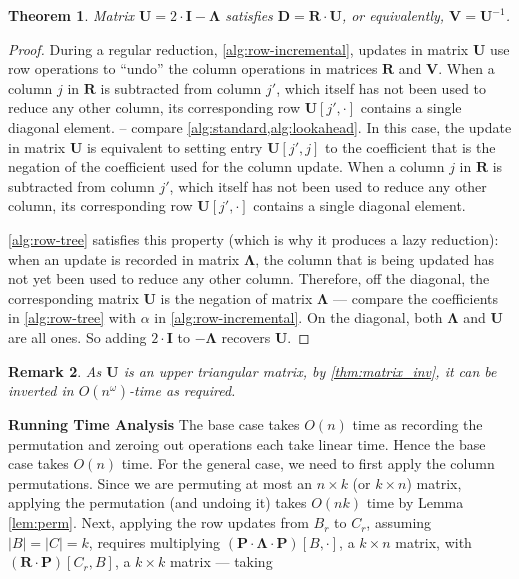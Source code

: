 \documentclass[10pt,a4paper]{article}
\newtheorem{theorem}{Theorem}[section]
\newtheorem{remark}[theorem]{Remark}
\newcommand{\matsize}[2]{#1\times #2}
\newcommand{\matexp}{\omega}
\newcommand{\mat}[1]{\mathbf{#1}}
\begin{document}
\begin{theorem}
    Matrix $\mat{U} = 2\cdot \mat{I} - \mat{\Lambda}$ satisfies $\mat{D} = \mat{R} \cdot \mat{U}$, or equivalently, $\mat{V} = \mat{U}^{-1}$.
\end{theorem}
\begin{proof}
    During a regular reduction, \cref{alg:row-incremental}, updates in matrix $\mat{U}$ use row operations to ``undo'' the column operations in matrices $\mat{R}$ and $\mat{V}$. When a column $j$ in $\mat{R}$ is subtracted from column $j'$, which itself has not been used to reduce any other column, its corresponding row $\mat{U}[j',\cdot]$ contains a single diagonal element.
     -- compare \cref{alg:standard,alg:lookahead}.
    In this case, the update in matrix $\mat{U}$ is equivalent to setting entry $\mat{U}[j',j]$ to the coefficient that is the negation of the coefficient used for the column update.
%
%
 When a column $j$ in $\mat{R}$ is subtracted from column $j'$, which itself has not been used to reduce any other column, its corresponding row $\mat{U}[j',\cdot]$ contains a single diagonal element.

    \cref{alg:row-tree} satisfies this property (which is why it produces a lazy reduction): when an update is recorded in matrix $\mat{\Lambda}$, the column that is being updated has not yet been used to reduce any other column. Therefore, off the diagonal,  the corresponding matrix $\mat{U}$ is the negation of matrix $\mat{\Lambda}$ --- compare the coefficients in  \cref{alg:row-tree} with $\alpha$ in  \cref{alg:row-incremental}. On the diagonal, both $\mat{\Lambda}$ and $\mat{U}$ are all ones.
    So adding $2 \cdot \mat{I}$ to $-\mat{\Lambda}$ recovers $\mat{U}$.
\end{proof}
\begin{remark}
As $\mat{U}$ is an upper triangular matrix, by \cref{thm:matrix_inv}, it can be inverted in $O(n^{\matexp})$-time as required. 
\end{remark}
\noindent\textbf{Running Time Analysis}
The base case takes $O(n)$ time as recording the permutation and zeroing out operations each take linear time. Hence the base case takes $O(n)$ time. 
%
For the general case, we need to first apply the column permutations. Since we are permuting at most an $\matsize{n}{k}$ (or $\matsize{k}{n}$) matrix, applying the permutation (and undoing it) takes $O(nk)$ time by Lemma \ref{lem:perm}. 
Next, applying the row updates from $B_r$ to $C_r$, assuming $|B|=|C| = k$, requires multiplying $(\mat{P} \cdot \mat{\Lambda} \cdot \mat{P})[B,\cdot]$, a $\matsize{k}{n}$ matrix, with $(\mat{R}\cdot\mat{P})[C_r,B]$, a $\matsize{k}{k}$ matrix --- taking
\end{document}
